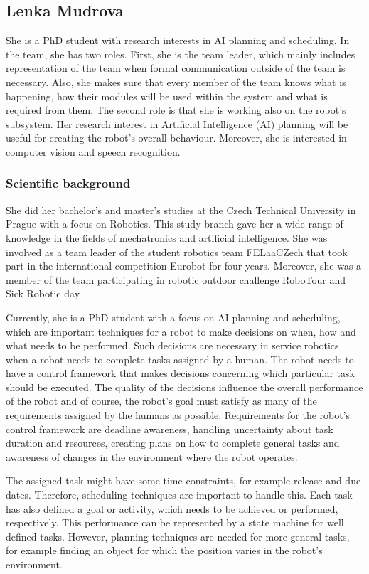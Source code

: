 \documentclass[conference]{IEEEtran}
\begin{document}
\subsection{Lenka Mudrova}

She is a PhD student with research interests in AI planning and scheduling. In the team, she has two roles. First, she is the team leader, which mainly includes representation of the team when formal communication outside of the team is necessary. Also, she makes sure that every member of the team knows what is happening, how their modules will be used within the system and what is required from them. The second role is that she is working also on the robot's subsystem. Her research interest in Artificial Intelligence (AI) planning will be useful for creating the robot's overall behaviour. Moreover, she is interested in computer vision and speech recognition.

\subsubsection*{Scientific background}
She did her bachelor's and master's studies at the Czech Technical University in Prague with a focus on Robotics. This study branch gave her a wide range of knowledge in the fields of mechatronics and artificial intelligence. She was involved as a team leader of the student robotics team FELaaCZech that took part in the international competition Eurobot for four years. Moreover, she was a member of the team participating in robotic outdoor challenge RoboTour and Sick Robotic day. 

Currently, she is a PhD student with a focus on AI planning and scheduling, which are important techniques for a robot to make decisions on when, how and what needs to be performed. Such decisions are necessary in service robotics when a robot needs to complete tasks assigned by a human. The robot needs to have a control framework that makes decisions concerning which particular task should be executed. The quality of the decisions influence the overall performance of the robot and of course, the robot's goal must satisfy as many of the requirements assigned by the humans as possible. Requirements for the robot's control framework are deadline awareness, handling uncertainty about task duration and resources, creating plans on how to complete general tasks and awareness of changes in the environment where the robot operates. 

The assigned task might have some time constraints, for example release and due dates. Therefore, scheduling techniques are important to handle this. Each task has also defined a goal or activity, which needs to be achieved or performed, respectively. This performance can be represented by a state machine for well defined tasks. However, planning techniques are needed for more general tasks, for example finding an object for which the position varies in the robot's environment.
\end{document}
